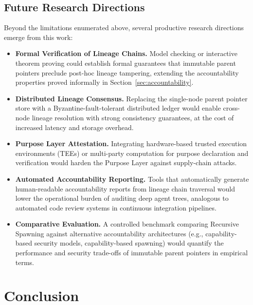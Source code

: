 \subsection{Future Research Directions}
\label{sec:future-work}

Beyond the limitations enumerated above, several productive research directions emerge from this work:

\begin{itemize}
    \item \textbf{Formal Verification of Lineage Chains.} Model checking or interactive theorem proving could establish formal guarantees that immutable parent pointers preclude post-hoc lineage tampering, extending the accountability properties proved informally in Section~\ref{sec:accountability}.

    \item \textbf{Distributed Lineage Consensus.} Replacing the single-node parent pointer store with a Byzantine-fault-tolerant distributed ledger would enable cross-node lineage resolution with strong consistency guarantees, at the cost of increased latency and storage overhead.

    \item \textbf{Purpose Layer Attestation.} Integrating hardware-based trusted execution environments (TEEs) or multi-party computation for purpose declaration and verification would harden the Purpose Layer against supply-chain attacks.

    \item \textbf{Automated Accountability Reporting.} Tools that automatically generate human-readable accountability reports from lineage chain traversal would lower the operational burden of auditing deep agent trees, analogous to automated code review systems in continuous integration pipelines.

    \item \textbf{Comparative Evaluation.} A controlled benchmark comparing Recursive Spawning against alternative accountability architectures (e.g., capability-based security models, capability-based spawning) would quantify the performance and security trade-offs of immutable parent pointers in empirical terms.
\end{itemize}


\section{Conclusion}
\label{sec:conclusion}

